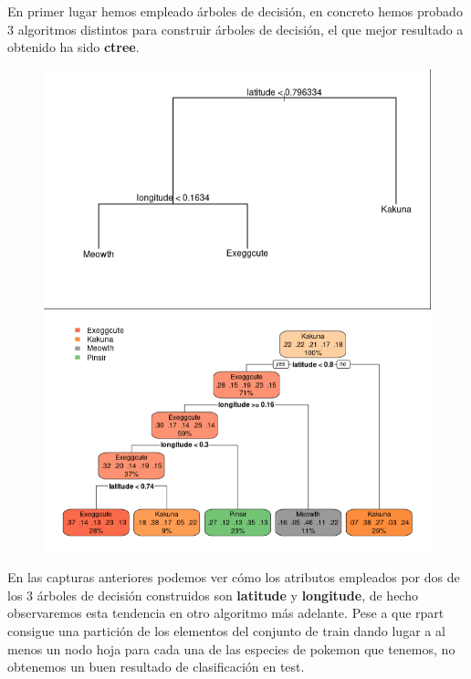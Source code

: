 En primer lugar hemos empleado árboles de decisión, en concreto hemos probado 3 algoritmos distintos para construir árboles de decisión, el que mejor resultado a obtenido ha sido \textbf{ctree}.

\begin{figure}[H]
	\centering
	\includegraphics[width=\textwidth]{img/tree.png}
	\includegraphics[width=\textwidth]{img/rpart.png}
\end{figure}

En las capturas anteriores podemos ver cómo los atributos empleados por dos de los 3 árboles de decisión construidos son \textbf{latitude} y \textbf{longitude}, de hecho observaremos esta tendencia en otro algoritmo más adelante. Pese a que rpart consigue una partición de los elementos del conjunto de train dando lugar a al menos un nodo hoja para cada una de las especies de pokemon que tenemos, no obtenemos un buen resultado de clasificación en test.\\

